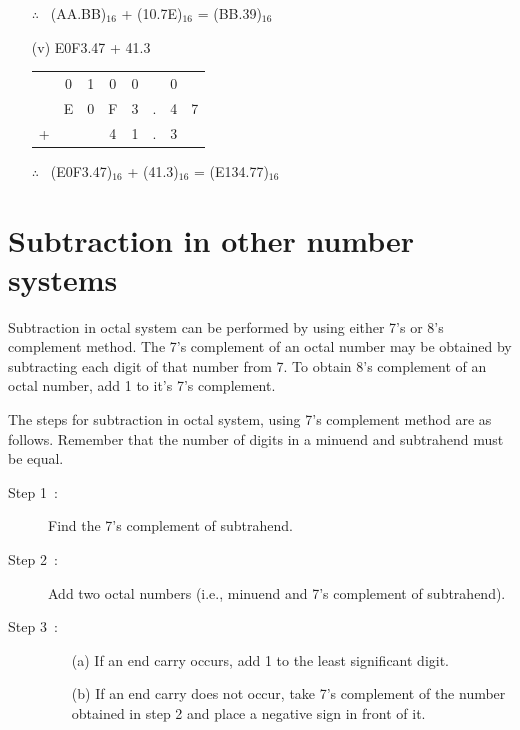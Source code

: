 \begin{solution}
\begin{itemize}
\medskip
$\therefore$~ (AA.BB)$_{16}$ + (10.7E)$_{16}$ = (BB.39)$_{16}$

\item[(v)] E0F3.47 + 41.3

\begin{tabular}{cccccccc}
 & {\footnotesize 0} & {\footnotesize 1} & {\footnotesize 0} & {\footnotesize 0} & & {\footnotesize 0} & \\
 & E & 0 & F & 3 & . & 4 & 7\\
+ & & & 4 & 1 & . & 3 & \\
\cline{2-8}
\end{tabular}

\medskip
$\therefore$~ (E0F3.47)$_{16}$ + (41.3)$_{16}$ = (E134.77)$_{16}$
\end{itemize}
\end{solution}

\section{Subtraction in other number systems}\label{sec5.8}


Subtraction in octal system can be performed by using either 7's or 8's complement method. The 7's complement of an octal number may be obtained by subtracting each digit of that number from 7. To obtain 8's complement of an octal number, add 1 to it's 7's complement.

\smallskip
{} The steps for subtraction in octal system, using 7's complement method are as follows. Remember that the number of digits in a minuend and subtrahend must be equal.
\begin{description}
\item[Step 1~:] Find the 7's complement of subtrahend.

\item[Step 2~:] Add two octal numbers (i.e., minuend and 7's complement of subtrahend).

\item[Step 3~:] 
\begin{itemize}
\item[(a)] If an end carry occurs, add 1 to the least significant digit.

\item[(b)] If an end carry does not occur, take 7's complement of the number obtained in step 2 and place a negative sign in front of it.
\end{itemize}
\end{description}

